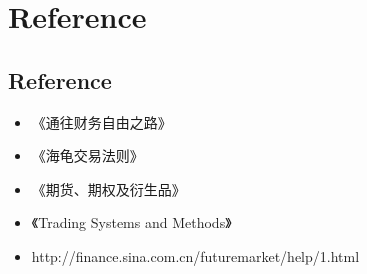 \documentclass{beamer}
\begin{document}
\section{Reference}
\subsection{Reference}
\begin{frame}
  \begin{itemize}
    \item 《通往财务自由之路》
    \item 《海龟交易法则》
    \item 《期货、期权及衍生品》
    \item 《Trading Systems and Methods》
    \item http://finance.sina.com.cn/futuremarket/help/1.html
  \end{itemize}
\end{frame}
\end{document}
